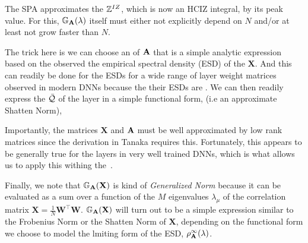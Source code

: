The SPA approximates the \PartitionFunction $\mathbb{Z}^{IZ}$, which is now an HCIZ integral,  by its peak value.
For this, $\mathbb{G}_{\mathbf{A}}(\lambda)$ itself must either not explicitly depend on $N$ and/or at least not grow faster than $N$.

The trick here is we can choose an \RTransform of $\mathbf{\mathbf{A}}$
that is a simple analytic expression based on the observed
the empirical spectral density (ESD) of the $\mathbf{X}$.
And this can readily be done for the ESDs for a wide range of layer weight matrices
observed in modern DNNs because the their ESDs are \HeavyTailed \PowerLaw\cite{MM19_HTSR_ICML}.
We can then readily express the \Quality $\bar{\mathcal{Q}}$ of the \Teacher
layer in a simple functional form, (i.e  an approximate Shatten Norm),

Importantly, the matrices $\mathbf{X}$  and $\mathbf{\mathbf{A}}$ must be well approximated
by low rank matrices since the derivation in Tanaka requires this.  Fortunately,
this appears to be generally true for the layers in very well trained DNNs,
which is what allows us to apply this withing the~\ECS.

Finally, we note that $\mathbb{G}_{\mathbf{A}}(\mathbf{X})$ is kind of \emph{Generalized Norm} because 
it can be evaluated as a sum over a function of the $M$ eigenvalues $\lambda_{\mu}$ of the \Teacher
correlation matrix $\mathbf{X}=\frac{1}{N}\mathbf{W}^{\top}\mathbf{W}$.
$\mathbb{G}_{\mathbf{A}}(\mathbf{X})$  will turn out to be a simple expression similar to the Frobenius Norm or the
Shatten Norm of $\mathbf{X}$, depending on the functional form we choose to model the
lmiting form of the \Student ESD, $\rho_{\mathbf{A}}^{\infty}(\lambda)$.







